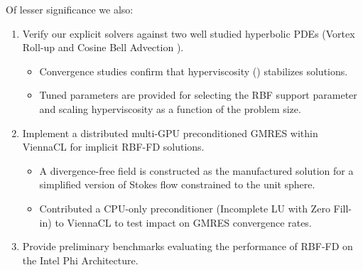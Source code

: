 \documentclass[11pt]{report}
\begin{document}
Of lesser significance we also: 
\begin{enumerate}
\item Verify our explicit solvers against two well studied hyperbolic PDEs (Vortex Roll-up \cite{NairTransport05, NairJablonowski08} and Cosine Bell Advection \cite{JakobChien1995}).
\begin{itemize} 
\item Convergence studies confirm that hyperviscosity (\cite{Fornberg2011b}) stabilizes solutions.
\item Tuned parameters are provided for selecting the RBF support parameter and scaling hyperviscosity as a function of the problem size.
\end{itemize}
\item Implement a distributed multi-GPU preconditioned GMRES within ViennaCL for implicit RBF-FD solutions.
\begin{itemize} 
\item A divergence-free field is constructed as the manufactured solution for a simplified version of Stokes flow constrained to the unit sphere. 
\item Contributed a CPU-only preconditioner (Incomplete LU with Zero Fill-in) to ViennaCL to test impact on GMRES convergence rates.
\end{itemize}
\item Provide preliminary benchmarks evaluating the performance of RBF-FD on the Intel Phi Architecture. 
\end{enumerate}



\ifstandalone


\end{document}
